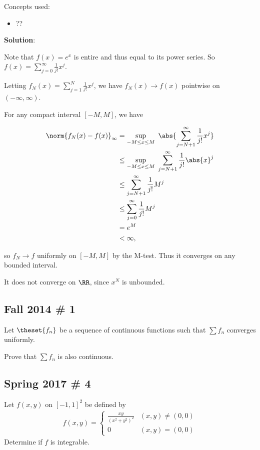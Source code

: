 \begin{solution}

Concepts used:

\begin{itemize}
\tightlist
\item
  ??
\end{itemize}

\textbf{Solution}:

Note that \(f(x) = e^x\) is entire and thus equal to its power series.
So \(f(x) = \sum_{j=0}^\infty \frac 1 {j!}x^j\).

Letting \(f_N(x) = \sum_{j=1}^N \frac 1 {j!} x^j\), we have
\(f_N(x) \to f(x)\) pointwise on \((-\infty ,\infty)\).

For any compact interval \([-M, M]\), we have

\begin{align*}
\norm{f_N(x) - f(x)}_\infty
&= \sup_{-M\leq x \leq M} ~\abs{\sum_{j=N+1}^\infty \frac 1 {j!} x^j} \\
&\leq \sup_{-M\leq x \leq M} ~ \sum_{j=N+1}^\infty \frac 1 {j!} \abs{x}^j \\
&\leq \sum_{j=N+1}^\infty \frac 1 {j!} M^j \\
&\leq \sum_{j=0}^\infty \frac 1 {j!} M^j \\
&= e^M \\
&<\infty
,\end{align*}

so \(f_N \to f\) uniformly on \([-M, M]\) by the M-test. Thus it
converges on any bounded interval.

It does not converge on \(\RR\), since \(x^N\) is unbounded.

\end{solution}

\hypertarget{fall-2014-1}{%
\subsection{Fall 2014 \# 1}\label{fall-2014-1}}

Let \(\theset{f_n}\) be a sequence of continuous functions such that
\(\sum f_n\) converges uniformly.

Prove that \(\sum f_n\) is also continuous.

\hypertarget{spring-2017-4}{%
\subsection{Spring 2017 \# 4}\label{spring-2017-4}}

Let \(f(x, y)\) on \([-1, 1]^2\) be defined by
\begin{align*}
f(x, y) = \begin{cases}
\frac{x y}{\left(x^{2}+y^{2}\right)^{2}} & (x, y) \neq (0, 0) \\
0 & (x, y) = (0, 0)
\end{cases}
\end{align*} Determine if \(f\) is integrable.

